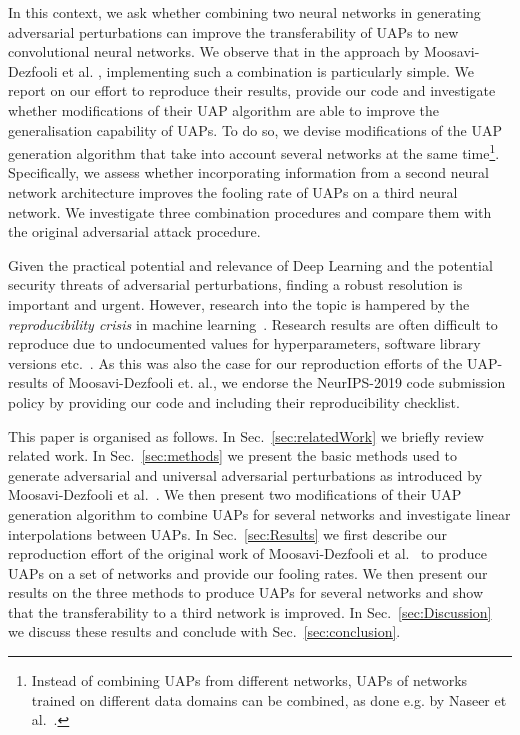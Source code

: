 \documentclass[runningheads]{llncs}
\begin{document}
In this context, we ask whether combining two neural networks in generating adversarial perturbations can improve the transferability of UAPs to new convolutional neural networks. We observe that in the approach by Moosavi-Dezfooli et al. \cite{moosavidezfooli_universal_2017,moosavi-dezfooli_deepfool_2016}, implementing such a combination is particularly simple. 
We report on our effort to reproduce their results, provide our code and investigate whether modifications of their UAP algorithm are able to improve the generalisation capability of UAPs. To do so, we devise modifications of the UAP generation algorithm that take into account several networks at the same time\footnote{Instead of combining UAPs from different networks, UAPs of networks trained on different data domains can be combined, as done e.g. by Naseer et al.~\cite{NIPS2019_9450}.}.
Specifically, we assess whether incorporating information from a second neural network architecture improves the fooling rate of UAPs on a third neural network. We investigate three combination procedures and compare them with the original adversarial attack procedure.

Given the practical potential and relevance of Deep Learning and the potential security threats of adversarial perturbations, finding a robust resolution is important and urgent. However, research into the topic is hampered by the \emph{reproducibility crisis} in machine learning~\cite{raff2020quantifying}. Research results are often difficult to reproduce due to undocumented values for hyperparameters, software library versions etc.~\cite{Gundersen2018StateOT}. As this was also the case for our reproduction efforts of the UAP-results of Moosavi-Dezfooli et. al., we endorse the NeurIPS-2019 code submission policy by providing our code and including their reproducibility checklist.

This paper is organised as follows. In Sec.~\ref{sec:relatedWork} we briefly review related work. In Sec.~\ref{sec:methods} we present the basic methods used to generate adversarial and universal adversarial perturbations as introduced by Moosavi-Dezfooli et al.~\cite{moosavidezfooli_universal_2017}. We then present two modifications of their UAP generation algorithm to combine UAPs for several networks and investigate linear interpolations between UAPs. In Sec.~\ref{sec:Results} we first describe our reproduction effort of the original work of Moosavi-Dezfooli et al.~\cite{moosavidezfooli_universal_2017} to produce UAPs on a set of networks and provide our fooling rates. We then present our results on the three methods to produce UAPs for several networks and show that the transferability to a third network is improved. In Sec.~\ref{sec:Discussion} we discuss these results and conclude with Sec.~\ref{sec:conclusion}.
\end{document}
